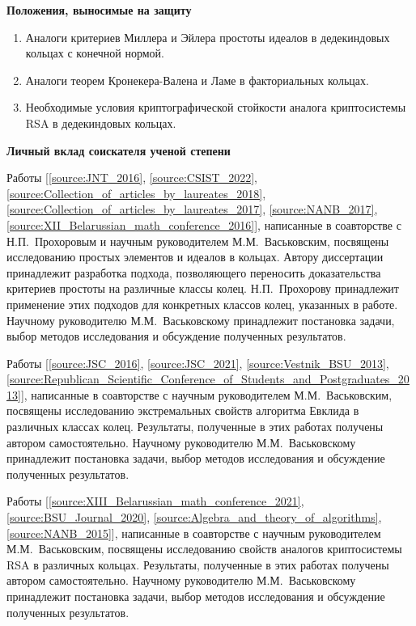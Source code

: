 \documentclass[_00_dissertation.tex]{subfiles}
\begin{document}
\begin{center}
\textbf{Положения, выносимые на защиту}
\end{center}

\begin{enumerate}
    \item Аналоги критериев Миллера и Эйлера простоты идеалов в дедекиндовых кольцах с конечной нормой.
    
    \item Аналоги теорем Кронекера-Валена и Ламе в факториальных кольцах.
    
    \item Необходимые условия криптографической стойкости аналога криптосистемы RSA в дедекиндовых кольцах.
\end{enumerate}

\begin{center}
\textbf{Личный вклад соискателя ученой степени}
\end{center}

Работы [\ref{source:JNT_2016}, \ref{source:CSIST_2022}, \ref{source:Collection_of_articles_by_laureates_2018}, \ref{source:Collection_of_articles_by_laureates_2017}, \ref{source:NANB_2017}, \ref{source:XII_Belarussian_math_conference_2016}], написанные в соавторстве с Н.П.~Прохоровым и научным руководителем М.М.~Васьковским, посвящены исследованию простых элементов и идеалов в кольцах.
Автору диссертации принадлежит разработка подхода, позволяющего переносить доказательства критериев простоты на различные классы колец.
Н.П.~Прохорову принадлежит применение этих подходов для конкретных классов колец, указанных в работе.
Научному руководителю М.М.~Васьковскому принадлежит постановка задачи, выбор методов исследования и обсуждение полученных результатов.

Работы [\ref{source:JSC_2016}, \ref{source:JSC_2021}, \ref{source:Vestnik_BSU_2013}, \ref{source:Republican_Scientific_Conference_of_Students_and_Postgraduates_2013}], написанные в соавторстве с научным руководителем М.М.~Васьковским, посвящены исследованию экстремальных свойств алгоритма Евклида в различных  классах колец.
Результаты, полученные  в этих работах получены  автором самостоятельно.
Научному руководителю М.М.~Васьковскому принадлежит постановка задачи, выбор методов исследования и обсуждение полученных результатов.

Работы [\ref{source:XIII_Belarussian_math_conference_2021}, \ref{source:BSU_Journal_2020}, \ref{source:Algebra_and_theory_of_algorithms}, \ref{source:NANB_2015}], написанные в соавторстве с научным руководителем М.М.~Васьковским, посвящены исследованию свойств аналогов криптосистемы RSA в различных кольцах.
Результаты, полученные  в этих работах получены  автором самостоятельно.
Научному руководителю М.М.~Васьковскому принадлежит постановка задачи, выбор методов исследования и обсуждение полученных результатов.
\end{document}

